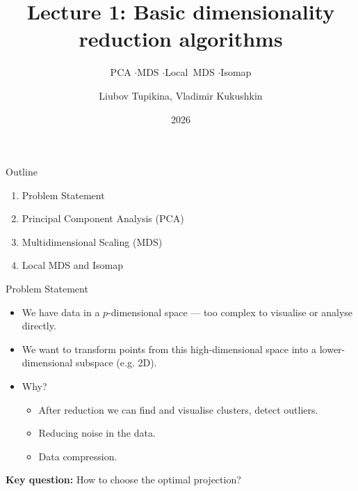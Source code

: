 \documentclass[aspectratio=169,t]{beamer}
\title{Lecture 1: Basic dimensionality reduction algorithms}
\subtitle{PCA \enspace$\cdot$\enspace MDS \enspace$\cdot$\enspace Local~MDS \enspace$\cdot$\enspace Isomap}
\author{Liubov Tupikina, Vladimir Kukushkin}
\institute{Constructor University}
\date{2026}
\begin{document}
\maketitle

\begin{frame}{Outline}
  \vspace{0.4cm}
  \begin{enumerate}
    \setlength{\itemsep}{0.4cm}
    \item Problem Statement
    \item Principal Component Analysis (PCA)
    \item Multidimensional Scaling (MDS)
    \item Local MDS and Isomap
  \end{enumerate}
\end{frame}



\begin{frame}{Problem Statement}
  \begin{itemize}
    \setlength{\itemsep}{0.4cm}
    \item We have data in a $p$-dimensional space --- too complex to visualise or analyse directly.
    \item We want to transform points from this high-dimensional space into a lower-dimensional subspace (e.g. 2D).
    \item Why?
    \begin{itemize}
      \item After reduction we can find and visualise clusters, detect outliers.
      \item Reducing noise in the data.
      \item Data compression.
    \end{itemize}
  \end{itemize}

  \vspace{0.5cm}
  \textbf{Key question:} How to choose the optimal projection?
\end{frame}
\end{document}

